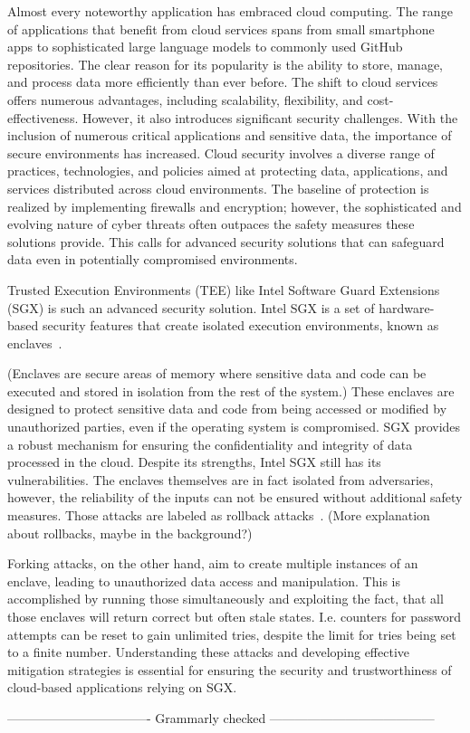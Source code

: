 
Almost every noteworthy application has embraced cloud computing. The range of applications that benefit from cloud services spans from small smartphone apps to sophisticated large language models to commonly used GitHub repositories. The clear reason for its popularity is the ability to store, manage, and process data more efficiently than ever before. The shift to cloud services offers numerous advantages, including scalability, flexibility, and cost-effectiveness. However, it also introduces significant security challenges. With the inclusion of numerous critical applications and sensitive data, the importance of secure environments has increased. Cloud security involves a diverse range of practices, technologies, and policies aimed at protecting data, applications, and services distributed across cloud environments. The baseline of protection is realized by implementing firewalls and encryption; however, the sophisticated and evolving nature of cyber threats often outpaces the safety measures these solutions provide. This calls for advanced security solutions that can safeguard data even in potentially compromised environments.


Trusted Execution Environments (TEE) like Intel Software Guard Extensions (SGX) is such an advanced security solution. Intel SGX is a set of hardware-based security features that create isolated execution environments, known as enclaves~\cite{nfw}. 

(Enclaves are secure areas of memory where sensitive data and code can be executed and stored in isolation from the rest of the system.) These enclaves are designed to protect sensitive data and code from being accessed or modified by unauthorized parties, even if the operating system is compromised. SGX provides a robust mechanism for ensuring the confidentiality and integrity of data processed in the cloud. Despite its strengths, Intel SGX still has its vulnerabilities. The enclaves themselves are in fact isolated from adversaries, however, the reliability of the inputs can not be ensured without additional safety measures. Those attacks are labeled as rollback attacks~\cite{esccc}. (More explanation about rollbacks, maybe in the background?)

Forking attacks, on the other hand, aim to create multiple instances of an enclave, leading to unauthorized data access and manipulation. This is accomplished by running those simultaneously and exploiting the fact, that all those enclaves will return correct but often stale states. I.e. counters for password attempts can be reset to gain unlimited tries, despite the limit for tries being set to a finite number. Understanding these attacks and developing effective mitigation strategies is essential for ensuring the security and trustworthiness of cloud-based applications relying on SGX.

---------------------------------- Grammarly checked ---------------------------------------